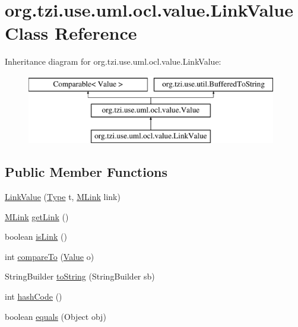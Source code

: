 \hypertarget{classorg_1_1tzi_1_1use_1_1uml_1_1ocl_1_1value_1_1_link_value}{\section{org.\-tzi.\-use.\-uml.\-ocl.\-value.\-Link\-Value Class Reference}
\label{classorg_1_1tzi_1_1use_1_1uml_1_1ocl_1_1value_1_1_link_value}
}
Inheritance diagram for org.\-tzi.\-use.\-uml.\-ocl.\-value.\-Link\-Value\-:\begin{figure}[H]
\begin{center}
\leavevmode
\includegraphics[height=3.000000cm]{classorg_1_1tzi_1_1use_1_1uml_1_1ocl_1_1value_1_1_link_value}
\end{center}
\end{figure}
\subsection*{Public Member Functions}
\begin{DoxyCompactItemize}
\item 
\hyperlink{classorg_1_1tzi_1_1use_1_1uml_1_1ocl_1_1value_1_1_link_value_a40b433c249c9d5a39874d2b2052a9d45}{Link\-Value} (\hyperlink{interfaceorg_1_1tzi_1_1use_1_1uml_1_1ocl_1_1type_1_1_type}{Type} t, \hyperlink{interfaceorg_1_1tzi_1_1use_1_1uml_1_1sys_1_1_m_link}{M\-Link} link)
\item 
\hyperlink{interfaceorg_1_1tzi_1_1use_1_1uml_1_1sys_1_1_m_link}{M\-Link} \hyperlink{classorg_1_1tzi_1_1use_1_1uml_1_1ocl_1_1value_1_1_link_value_a623136f8a06107c1acc74d2b74121198}{get\-Link} ()
\item 
boolean \hyperlink{classorg_1_1tzi_1_1use_1_1uml_1_1ocl_1_1value_1_1_link_value_aa2a2b68ae9ae80f02174911f319ac4e0}{is\-Link} ()
\item 
int \hyperlink{classorg_1_1tzi_1_1use_1_1uml_1_1ocl_1_1value_1_1_link_value_a2fe61909256f0f7cc7572bd01839adc8}{compare\-To} (\hyperlink{classorg_1_1tzi_1_1use_1_1uml_1_1ocl_1_1value_1_1_value}{Value} o)
\item 
String\-Builder \hyperlink{classorg_1_1tzi_1_1use_1_1uml_1_1ocl_1_1value_1_1_link_value_a2cefaaa3241c6d79ffc07a1394dd7cd5}{to\-String} (String\-Builder sb)
\item 
int \hyperlink{classorg_1_1tzi_1_1use_1_1uml_1_1ocl_1_1value_1_1_link_value_a84cc60ae6031d987bb7dec66290aa02a}{hash\-Code} ()
\item 
boolean \hyperlink{classorg_1_1tzi_1_1use_1_1uml_1_1ocl_1_1value_1_1_link_value_a47bcbb71d4fdc99e243c7d6e115e37ce}{equals} (Object obj)
\end{DoxyCompactItemize}
